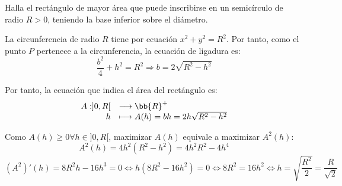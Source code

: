 \documentclass[12pt]{article}
\begin{document}
\begin{ejercicio}
    Halla el rectángulo de mayor área que puede inscribirse en un semicírculo de radio $R>0$, teniendo la base inferior sobre el diámetro.
    \begin{figure}[H]
        \centering
    \end{figure}

    La circunferencia de radio $R$ tiene por ecuación $x^2+y^2 = R^2$. Por tanto, como el punto $P$ pertenece a la circunferencia, la ecuación de ligadura es:
    \begin{equation*}
        \frac{b^2}{4} + h^2 = R^2 \Longrightarrow b=2\sqrt{R^2 - h^2}
    \end{equation*}

    Por tanto, la ecuación que indica el área del rectángulo es:
    \begin{equation*}
        \begin{array}{rl}
            A:]0,R[ & \longrightarrow \bb{R}^+\\
                    h & \longmapsto A(h) = bh = 2h\sqrt{R^2 - h^2}
        \end{array}
    \end{equation*}

    Como $A(h)\geq 0\forall h\in ]0,R[$, maximizar $A(h)$ equivale a maximizar $A^2(h)$:
    \begin{equation*}
        A^2(h) = 4h^2(R^2-h^2) = 4h^2R^2 - 4h^4
    \end{equation*}
    \begin{equation*}
        (A^2)'(h) = 8R^2h - 16h^3 = 0 \Longleftrightarrow h(8R^2-16h^2) = 0 \Longleftrightarrow 8R^2 = 16h^2 \Longleftrightarrow h=\sqrt{\frac{R^2}{2}} = \frac{R}{\sqrt{2}}
    \end{equation*}


\end{ejercicio}
\end{document}
